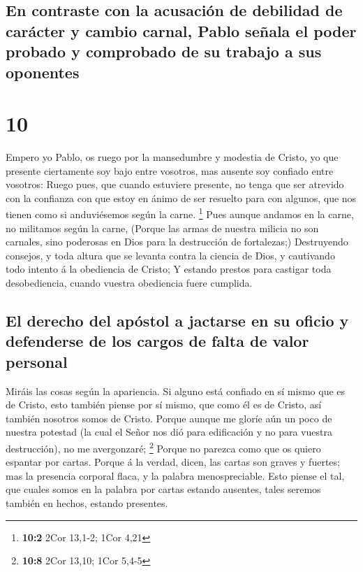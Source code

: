 \hypertarget{en-contraste-con-la-acusaciuxf3n-de-debilidad-de-caruxe1cter-y-cambio-carnal-pablo-seuxf1ala-el-poder-probado-y-comprobado-de-su-trabajo-a-sus-oponentes}{%
\subsection{En contraste con la acusación de debilidad de carácter y
cambio carnal, Pablo señala el poder probado y comprobado de su trabajo
a sus
oponentes}\label{en-contraste-con-la-acusaciuxf3n-de-debilidad-de-caruxe1cter-y-cambio-carnal-pablo-seuxf1ala-el-poder-probado-y-comprobado-de-su-trabajo-a-sus-oponentes}}

\hypertarget{section-9}{%
\section{10}\label{section-9}}

 Empero yo Pablo, os ruego por la mansedumbre y modestia de
Cristo, yo que presente ciertamente soy bajo entre vosotros, mas ausente
soy confiado entre vosotros:  Ruego pues, que cuando
estuviere presente, no tenga que ser atrevido con la confianza con que
estoy en ánimo de ser resuelto para con algunos, que nos tienen como si
anduviésemos según la carne. \footnote{\textbf{10:2} 2Cor 13,1-2; 1Cor
  4,21}  Pues aunque andamos en la carne, no militamos según
la carne,  (Porque las armas de nuestra milicia no son
carnales, sino poderosas en Dios para la destrucción de fortalezas;)
 Destruyendo consejos, y toda altura que se levanta contra
la ciencia de Dios, y cautivando todo intento á la obediencia de Cristo;
 Y estando prestos para castigar toda desobediencia, cuando
vuestra obediencia fuere cumplida.

\hypertarget{el-derecho-del-apuxf3stol-a-jactarse-en-su-oficio-y-defenderse-de-los-cargos-de-falta-de-valor-personal}{%
\subsection{El derecho del apóstol a jactarse en su oficio y defenderse
de los cargos de falta de valor
personal}\label{el-derecho-del-apuxf3stol-a-jactarse-en-su-oficio-y-defenderse-de-los-cargos-de-falta-de-valor-personal}}

 Miráis las cosas según la apariencia. Si alguno está
confiado en sí mismo que es de Cristo, esto también piense por sí mismo,
que como él es de Cristo, así también nosotros somos de Cristo.
 Porque aunque me gloríe aún un poco de nuestra potestad (la
cual el Señor nos dió para edificación y no para vuestra destrucción),
no me avergonzaré; \footnote{\textbf{10:8} 2Cor 13,10; 1Cor 5,4-5}
 Porque no parezca como que os quiero espantar por cartas.
 Porque á la verdad, dicen, las cartas son graves y
fuertes; mas la presencia corporal flaca, y la palabra menospreciable.
 Esto piense el tal, que cuales somos en la palabra por
cartas estando ausentes, tales seremos también en hechos, estando
presentes.

